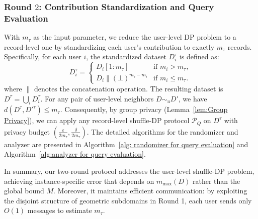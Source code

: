 

\subsubsection{Round $2$: Contribution Standardization and Query Evaluation}


With $m_\tau$ as the input parameter, we reduce the user-level DP problem to a record-level one by standardizing each user's contribution to exactly $m_\tau$ records. Specifically, for each user $i$, the standardized dataset $D_i^\tau$ is defined as:
$$D^\tau_i =
\begin{cases}
D_i[1:m_\tau] & \text{if } m_i > m_\tau, \\
D_i \mathbin{\|} (\bot)^{m_\tau - m_i} & \text{if } m_i \le m_\tau.
\end{cases}
$$
where $\|$ denotes the concatenation operation. The resulting dataset is $D^\tau = \bigcup_i D^\tau_i$. For any pair of user-level neighbors $D \sim_u D'$, we have $d(D^{\tau}, D'^\tau) \le m_\tau$. Consequently, by group privacy (Lemma~\ref{lem:Group Privacy}), we can apply any record-level shuffle-DP protocol $\mathcal{P}_Q$ on $D^\tau$ with privacy budget $(\frac{\varepsilon}{2m_\tau}, \frac{\delta}{2m_\tau})$. The detailed algorithms for the randomizer and analyzer are presented in Algorithm~\ref{alg: randomizer for query evaluation} and Algorithm~\ref{alg:analyzer for query evaluation}.





In summary, our two-round protocol addresses the user-level shuffle-DP problem, achieving instance-specific error that depends on $m_{\max}(D)$ rather than the global bound $M$. Moreover, it maintains efficient communication: by exploiting the disjoint structure of geometric subdomains in Round 1, each user sends only $O(1)$ messages to estimate $m_\tau$.



